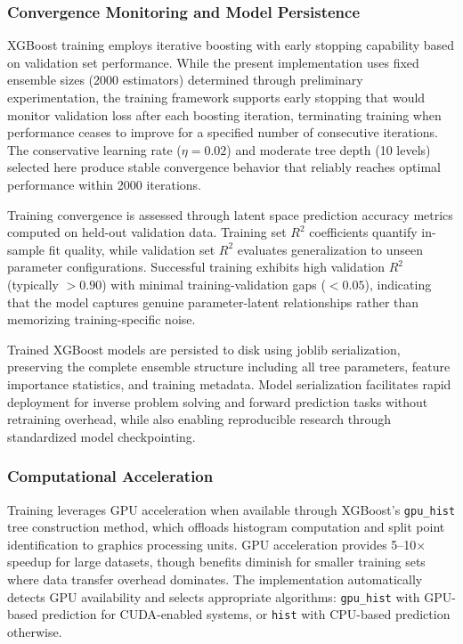 \documentclass[12pt,a4paper]{report}
\begin{document}
\subsubsection{Convergence Monitoring and Model Persistence}

XGBoost training employs iterative boosting with early stopping capability based on validation set performance. While the present implementation uses fixed ensemble sizes (2000 estimators) determined through preliminary experimentation, the training framework supports early stopping that would monitor validation loss after each boosting iteration, terminating training when performance ceases to improve for a specified number of consecutive iterations. The conservative learning rate ($\eta = 0.02$) and moderate tree depth (10 levels) selected here produce stable convergence behavior that reliably reaches optimal performance within 2000 iterations.

Training convergence is assessed through latent space prediction accuracy metrics computed on held-out validation data. Training set $R^2$ coefficients quantify in-sample fit quality, while validation set $R^2$ evaluates generalization to unseen parameter configurations. Successful training exhibits high validation $R^2$ (typically $> 0.90$) with minimal training-validation gaps ($< 0.05$), indicating that the model captures genuine parameter-latent relationships rather than memorizing training-specific noise.

Trained XGBoost models are persisted to disk using joblib serialization, preserving the complete ensemble structure including all tree parameters, feature importance statistics, and training metadata. Model serialization facilitates rapid deployment for inverse problem solving and forward prediction tasks without retraining overhead, while also enabling reproducible research through standardized model checkpointing.

\subsubsection{Computational Acceleration}

Training leverages GPU acceleration when available through XGBoost's \texttt{gpu\_hist} tree construction method, which offloads histogram computation and split point identification to graphics processing units. GPU acceleration provides 5–10× speedup for large datasets, though benefits diminish for smaller training sets where data transfer overhead dominates. The implementation automatically detects GPU availability and selects appropriate algorithms: \texttt{gpu\_hist} with GPU-based prediction for CUDA-enabled systems, or \texttt{hist} with CPU-based prediction otherwise.
\end{document}
